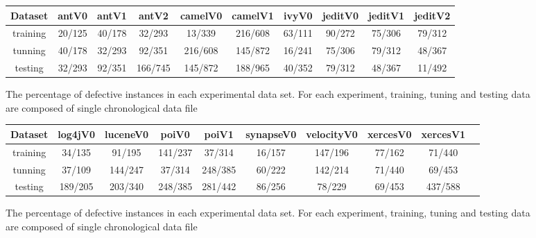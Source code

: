 \documentclass{acm_proc_article-sp}
\begin{document}
\begin{figure*}[!ht]
\scriptsize
\centering
  \begin{tabular}{c c c c c c c c c c }
  \hline\hline
  Dataset &antV0&antV1&antV2&camelV0&camelV1&ivyV0&jeditV0&jeditV1&jeditV2
\\\hline
  training &20/125 &40/178 &32/293 &13/339 &216/608 &63/111 &90/272 &75/306 &79/312
\\  tunning  &40/178 &32/293 &92/351 &216/608 &145/872 &16/241 &75/306 &79/312 &48/367
\\  testing &32/293 &92/351 &166/745 &145/872 &188/965 &40/352 &79/312 &48/367 &11/492
\\  \end{tabular}
   \caption{The percentage of defective instances in each experimental data set. For each experiment,  training, tuning and testing data are composed of single chronological data file}
\end{figure*}
\begin{figure*}[!ht]
\scriptsize
\centering
  \begin{tabular}{c c c c c c c c c c }
  \hline\hline
  Dataset &log4jV0&luceneV0&poiV0&poiV1&synapseV0&velocityV0&xercesV0&xercesV1
\\\hline
  training &34/135 &91/195 &141/237 &37/314 &16/157 &147/196 &77/162 &71/440
\\  tunning  &37/109 &144/247 &37/314 &248/385 &60/222 &142/214 &71/440 &69/453
\\  testing &189/205 &203/340 &248/385 &281/442 &86/256 &78/229 &69/453 &437/588
\\  \end{tabular}

   \caption{The percentage of defective instances in each experimental data set. For each experiment,  training, tuning and testing data are composed of single chronological data file}
\end{figure*}
\end{document}

